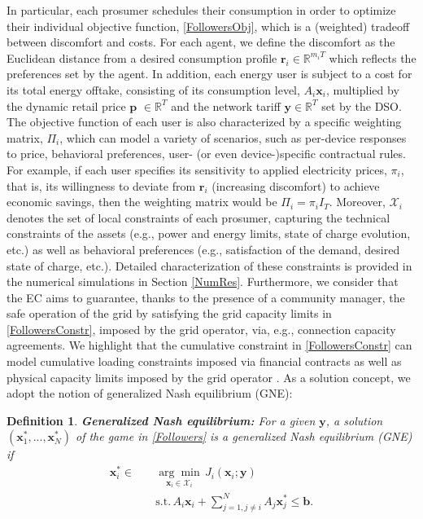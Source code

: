 \documentclass[letterpaper, 10 pt, conference]{ieeeconf}
\newcommand{\real}{\mathbb{R}}
\newcommand\bbf{\mathbf{b}}
\newcommand\pbf{\mathbf{p}}
\newcommand\rbf{\mathbf{r}}
\newcommand\xbf{\mathbf{x}}
\newcommand\ybf{\mathbf{y}}
\newtheorem{definition}{Definition}
\begin{document}
In particular, each prosumer schedules their consumption in order to optimize their individual objective function, \eqref{FollowersObj}, which is a (weighted) tradeoff between discomfort and costs. For each agent, we define the discomfort as the Euclidean distance from a desired consumption profile $\rbf_i \in \real^{m_iT}$ which reflects the preferences set by the agent. In addition, each energy user is subject to a cost for its total energy offtake, consisting of its consumption level, $A_i \xbf_i$, multiplied by the dynamic retail price $\pbf$ $\in \real^T$ and the network tariff $\ybf \in \real^T$ set by the DSO. The objective function of each user is also characterized by a specific weighting matrix, $\Pi_i$, which can model a variety of scenarios, such as per-device responses to price, behavioral preferences, user- (or even device-)specific contractual rules. For example, if each user specifies its sensitivity to applied electricity prices, $\pi_i$, that is, its willingness to deviate from $\rbf_i$ (increasing discomfort) to achieve economic savings, then the weighting matrix would be $\Pi_i=\pi_i I_T$. Moreover, $\mathcal{X}_i$ denotes the set of local constraints of each prosumer, capturing the technical constraints of the assets (e.g., power and energy limits, state of charge evolution, etc.) as well as behavioral preferences (e.g., satisfaction of the demand, desired state of charge, etc.). Detailed characterization of these constraints is provided in the numerical simulations in Section \ref{NumRes}. Furthermore, we consider that the EC aims to guarantee, thanks to the presence of a community manager, the safe operation of the grid by satisfying the grid capacity limits in \eqref{FollowersConstr}, imposed by the grid operator, via, e.g., connection capacity agreements.  We highlight that the cumulative constraint in \eqref{FollowersConstr} can model cumulative loading constraints imposed via financial contracts as well as physical capacity limits imposed by the grid operator \cite{SWEDEN}. 
As a solution concept, we adopt the notion of generalized Nash equilibrium (GNE):
\begin{definition}{\textbf{Generalized Nash equilibrium:}}
For a given $\ybf$, a solution $\left(\xbf^*_1, ..., \xbf^*_N\right)$ of the game in \eqref{Followers} is a generalized Nash equilibrium (GNE) if
\begin{equation}\label{NEWGAME}
\begin{aligned}
      \xbf^*_i \in \quad &\underset{\xbf_i \in \mathcal{X}_i} {\arg \min} \, J_i(\xbf_i; \ybf)\\ 
     &\mathrm{s.t.} \, A_i \xbf_i + \sum_{j=1, j \ne i}^N  A_j\xbf^*_j  \le  \bbf. \nonumber
\end{aligned}
\end{equation}
\end{definition}
\end{document}
